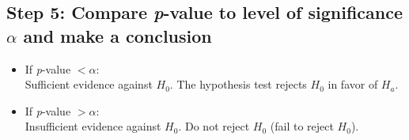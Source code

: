 \subsection*{Step 5: Compare \textit{p}-value to level of significance $\alpha$ and make a conclusion}

\begin{itemize}
  \item If \textit{p}-value $< \alpha$: \\
  \quad Sufficient evidence against $H_0$. The hypothesis test rejects $H_0$ in favor of $H_a$.

  \item If \textit{p}-value $> \alpha$: \\
  \quad Insufficient evidence against $H_0$. Do not reject $H_0$ (fail to reject $H_0$).
\end{itemize}

